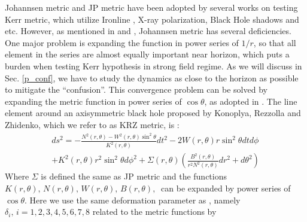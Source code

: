 \documentclass{article}
\begin{document}
Johannsen metric and JP metric have been adopted by several works on testing Kerr metric, which utilize Ironline\cite{t1_Iron} \cite{t4_Iron}, X-ray polarization\cite{t2_XrayPol}, Black Hole shadows\cite{t3_BHShadow} and etc. However, as mentioned in \cite{johannsen_diff} and \cite {KRZ}, Johannsen metric has several deficiencies. One major problem is expanding the function in power series of $1/r$, so that all element in the series are almost equally important near horizon, which puts a burden when testing Kerr hypothesis in strong field regime. As we will discuss in Sec. \ref{p_conf}, we have to study the dynamics as close to the horizon as possible to mitigate the ``confusion''. This convergence problem can be solved by expanding the metric function in power series of $\cos \theta$, as adopted in \cite{KRZ}. The line element around an axisymmetric black hole proposed by Konoplya, Rezzolla and Zhidenko, which we refer to as KRZ metric, is \cite{KRZ}:
\begin{equation}
\begin{aligned}
	ds^2=-\frac{N^2(r,\theta)-W^2(r,\theta)\sin^2\theta}{K^2(r,\theta)} dt^2-2W(r,\theta)r\sin^2\theta dtd\phi \\+ K^2(r,\theta) r^2\sin^2\theta d\phi^2  +\Sigma(r,\theta)(\frac{B^2(r,\theta)}{r^2 N^2(r,\theta)} dr^2+d\theta^2)
\end{aligned}
\end{equation}
Where $\Sigma$ is defined the same as JP metric and the functions $K(r,\theta),\, N(r,\theta),\, W(r,\theta),\, B(r,\theta),\ $ can be expanded by power series of $\cos\theta$. Here we use the same deformation parameter as \cite{cosimoKRZ}, namely $\delta_i, \, i=1,2,3,4,5,6,7,8$ related to the metric functions by
\end{document}
